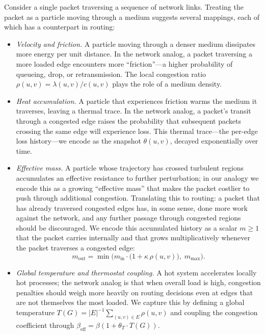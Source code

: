 Consider a single packet traversing a sequence of network links.
Treating the packet as a particle moving through a medium suggests
several mappings, each of which has a counterpart in routing:

\begin{itemize}
\item \emph{Velocity and friction.} A particle moving through a
denser medium dissipates more energy per unit distance. In the
network analog, a packet traversing a more loaded edge encounters
more ``friction''---a higher probability of queueing, drop, or
retransmission. The local congestion ratio $\rho(u,v) = \lambda(u,v)/c(u,v)$
plays the role of a medium density.

\item \emph{Heat accumulation.} A particle that experiences friction
warms the medium it traverses, leaving a thermal trace. In the
network analog, a packet's transit through a congested edge raises
the probability that subsequent packets crossing the same edge
will experience loss. This thermal trace---the per-edge loss
history---we encode as the snapshot $\theta(u,v)$, decayed
exponentially over time.

\item \emph{Effective mass.} A particle whose trajectory has crossed turbulent regions
accumulates an effective resistance to further perturbation; in
our analogy we encode this as a growing ``effective mass'' that
makes the packet costlier to push through additional congestion.
Translating this to routing: a packet
that has already traversed congested edges has, in some sense,
done more work against the network, and any further passage
through congested regions should be discouraged. We encode this
accumulated history as a scalar $m\ge 1$ that the packet carries
internally and that grows multiplicatively whenever the packet
traverses a congested edge:
\begin{equation}
m_{\text{out}} = \min\!\Big(m_{\text{in}}\cdot
                       \big(1+\kappa\,\rho(u,v)\big),\;m_{\max}\Big).
\label{eq:mass-update}
\end{equation}

\item \emph{Global temperature and thermostat coupling.} A
hot system accelerates locally hot processes; the network analog
is that when overall load is high, congestion penalties should
weigh more heavily on routing decisions even at edges that are
not themselves the most loaded. We capture this by defining a
global temperature $T(G) = |E|^{-1}\sum_{(u,v)\in E}\rho(u,v)$
and coupling the congestion coefficient through
$\beta_{\text{eff}} = \beta(1 + \theta_T\cdot T(G))$.
\end{itemize}


